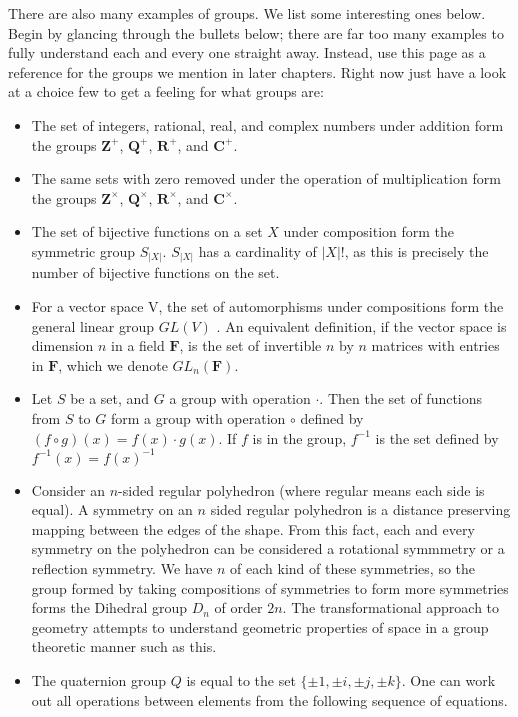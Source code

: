 \documentclass[12pt]{amsbook}
\theoremstyle{definition}
\newcommand{\bint}{\mathbf{Z}} %
\begin{document}
There are also many examples of groups. We list some interesting ones below. Begin by glancing through the bullets below; there are far too many examples to fully understand each and every one straight away. Instead, use this page as a reference for the groups we mention in later chapters. Right now just have a look at a choice few to get a feeling for what groups are:
%
\begin{itemize}
    \item The set of integers, rational, real, and complex numbers under addition form the groups $\bint^+$, $\mathbf{Q}^+$, $\mathbf{R}^+$, and $\mathbf{C}^+$.
    \item The same sets with zero removed under the operation of multiplication form the groups $\bint^\times$, $\mathbf{Q}^\times$, $\mathbf{R}^\times$, and $\mathbf{C}^\times$.
    \item The set of bijective functions on a set $X$ under composition form the symmetric group $S_{|X|}$. $S_{|X|}$ has a cardinality of $|X|!$, as this is precisely the number of bijective functions on the set.
    \item For a vector space V, the set of automorphisms under compositions form the general linear group $GL(V)$ . An equivalent definition, if the vector space is dimension $n$ in a field $\mathbf{F}$, is the set of invertible $n$ by $n$ matrices with entries in $\mathbf{F}$, which we denote $GL_n(\mathbf{F})$.
    \item Let $S$ be a set, and $G$ a group with operation $\cdotp$. Then the set of functions from $S$ to $G$ form a group with operation $\circ$ defined by $(f \circ g)(x) = f(x) \cdotp g(x)$. If $f$ is in the group, $f^{-1}$ is the set defined by $f^{-1}(x) = f(x)^{-1}$
    \item Consider an $n$-sided regular polyhedron (where regular means each side is equal). A symmetry on an $n$ sided regular polyhedron is a distance preserving mapping between the edges of the shape. From this fact, each and every symmetry on the polyhedron can be considered a rotational symmmetry or a reflection symmetry. We have $n$ of each kind of these symmetries, so the group formed by taking compositions of symmetries to form more symmetries forms the Dihedral group  $D_n$ of order $2n$. The transformational approach to geometry attempts to understand geometric properties of space in a group theoretic manner such as this.
    \item The quaternion group $Q$  is equal to the set $\{ \pm 1, \pm i, \pm j, \pm k \}$. One can work out all operations between elements from the following sequence of equations.

\end{itemize}
\end{document}
